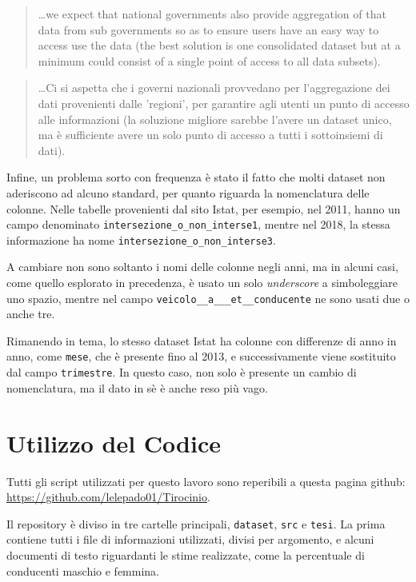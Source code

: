 \documentclass[a4paper,12pt]{report}
\newcommand{\columnstyle}[1]{\texttt{#1}}
\newcommand{\filenamestyle}[1]{\texttt{#1}}
\newcommand{\quotestyle}[1]{\textit{#1}}
\newcommand{\skipline}{\vspace{0.2in}}
\begin{document}
\begin{quotation}
    \dots we expect that national governments also provide aggregation 
    of that data from 
    sub governments so as to ensure users have an easy way to access use the data 
    (the best solution is one consolidated dataset but at a minimum could consist of a 
    single point of access to all data subsets).\cite{OPENDATAINDEX:1}
\end{quotation}

\begin{quotation}
    \dots Ci si aspetta che i governi nazionali provvedano per 
    l'aggregazione dei dati provenienti dalle 'regioni', per garantire agli utenti 
    un punto di accesso 
    alle informazioni (la soluzione migliore sarebbe l'avere un dataset unico, ma è sufficiente 
    avere un solo punto di accesso a tutti i sottoinsiemi di dati).
\end{quotation}

\skipline
Infine, un problema sorto con frequenza è stato il fatto che 
molti dataset non aderiscono ad 
alcuno standard, per quanto riguarda la nomenclatura delle colonne.
Nelle tabelle provenienti dal sito Istat, per esempio, nel 2011, hanno un campo denominato 
\columnstyle{intersezione\_o\_non\_interse1}, mentre nel 2018, la stessa informazione ha 
nome \columnstyle{intersezione\_o\_non\_interse3}. 

A cambiare non sono soltanto i nomi delle colonne negli anni, 
ma in alcuni casi, 
come quello esplorato in precedenza, è usato un solo \quotestyle{underscore} a 
simboleggiare uno spazio, mentre nel campo \columnstyle{veicolo\_\_a\_\_\_et\_\_conducente} 
ne sono usati due o anche tre.

Rimanendo in tema, lo stesso dataset Istat ha colonne con differenze di anno in anno, 
come \columnstyle{mese}, che è presente fino al 2013, e successivamente viene 
sostituito dal campo \columnstyle{trimestre}. 
In questo caso, non solo è presente un cambio di nomenclatura, ma il dato in sè è 
anche reso più vago.

\chapter{Utilizzo del Codice}

Tutti gli script utilizzati per questo lavoro sono reperibili a questa pagina 
github: \url{https://github.com/lelepado01/Tirocinio}.

Il repository è diviso in tre cartelle principali, \filenamestyle{dataset}, \filenamestyle{src} 
e \filenamestyle{tesi}. La prima contiene tutti i file di informazioni utilizzati, divisi per 
argomento, e alcuni documenti di testo riguardanti le stime realizzate, come la percentuale di 
conducenti maschio e femmina.
\end{document}
